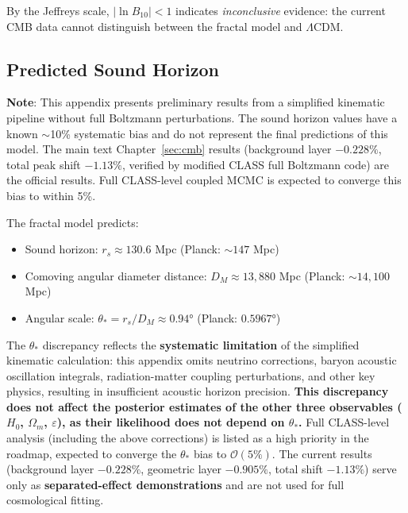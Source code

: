 \documentclass[12pt,a4paper,twocolumn]{article}
\begin{document}
By the Jeffreys scale, $|\ln B_{10}| < 1$ indicates \emph{inconclusive} evidence: the current CMB data cannot distinguish between the fractal model and $\Lambda$CDM.

\subsection{Predicted Sound Horizon}

\textbf{Note}: This appendix presents preliminary results from a simplified kinematic pipeline without full Boltzmann perturbations. The sound horizon values have a known $\sim$10\% systematic bias and do not represent the final predictions of this model. The main text Chapter~\ref{sec:cmb} results (background layer $-0.228\%$, total peak shift $-1.13\%$, verified by modified CLASS full Boltzmann code) are the official results. Full CLASS-level coupled MCMC is expected to converge this bias to within 5\%.

The fractal model predicts:
\begin{itemize}
\item Sound horizon: $r_s \approx 130.6$ Mpc (Planck: $\sim 147$ Mpc)
\item Comoving angular diameter distance: $D_M \approx 13{,}880$ Mpc (Planck: $\sim 14{,}100$ Mpc)
\item Angular scale: $\theta_* = r_s / D_M \approx 0.94°$ (Planck: $0.5967°$)
\end{itemize}
The $\theta_*$ discrepancy reflects the \textbf{systematic limitation} of the simplified kinematic calculation: this appendix omits neutrino corrections, baryon acoustic oscillation integrals, radiation-matter coupling perturbations, and other key physics, resulting in insufficient acoustic horizon precision. \textbf{This discrepancy does not affect the posterior estimates of the other three observables ($H_0$, $\Omega_m$, $\varepsilon$), as their likelihood does not depend on $\theta_*$.} Full CLASS-level analysis (including the above corrections) is listed as a high priority in the roadmap, expected to converge the $\theta_*$ bias to $\mathcal{O}(5\%)$. The current results (background layer $-0.228\%$, geometric layer $-0.905\%$, total shift $-1.13\%$) serve only as \textbf{separated-effect demonstrations} and are not used for full cosmological fitting.
\end{document}
